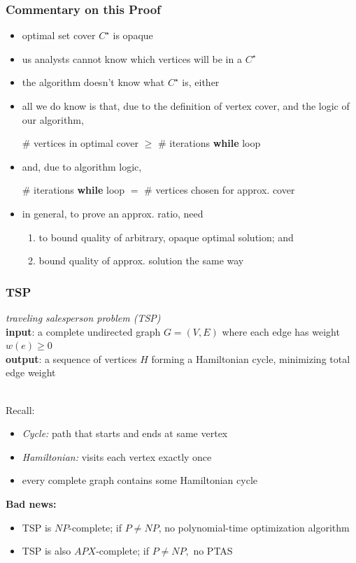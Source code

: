 \documentclass{beamer}
\newcommand{\stanza}{ \\~\ }
\begin{document}
\begin{frame} \frametitle{Commentary on this Proof}
\begin{itemize}
  \item optimal set cover $C^\star$ is opaque
  \item us analysts cannot know which vertices will be in a $C^\star$
  \item the algorithm doesn't know what $C^\star$ is, either
  \item all we do know is that, due to the definition of vertex cover, and
    the logic of our algorithm,
    \begin{center}
      \# vertices in optimal cover $\geq$ \# iterations \textbf{while} loop
    \end{center}
  \item and, due to algorithm logic,
  \begin{center}
      \# iterations \textbf{while} loop $=$ \# vertices chosen for approx. cover
  \end{center}
  \item in general, to prove an approx. ratio, need
  \begin{enumerate}
    \item to bound quality of arbitrary, opaque optimal solution; and
    \item bound quality of approx. solution the same way
  \end{enumerate}
\end{itemize}
\end{frame}

\begin{frame} \frametitle{TSP}
  \emph{traveling salesperson problem (TSP)} \\
  \textbf{input}: a complete undirected graph $G=(V,E)$ where each edge has weight $w(e) \geq 0$ \\
  \textbf{output}: a sequence of vertices $H$ forming a Hamiltonian cycle, minimizing
  total edge weight
  \stanza
  
  Recall:
  \begin{itemize}
    \item \emph{Cycle:} path that starts and ends at same vertex
    \item \emph{Hamiltonian:} visits each vertex exactly once
    \item every complete graph contains some Hamiltonian cycle
  \end{itemize}
  
  \textbf{Bad news:}
  \begin{itemize}
    \item TSP is $NP$-complete; if $P \ne NP$, no polynomial-time optimization algorithm
    \item TSP is also $APX$-complete; if $P \ne NP,$ no PTAS
  \end{itemize}
  \end{frame}
  
\end{document}
